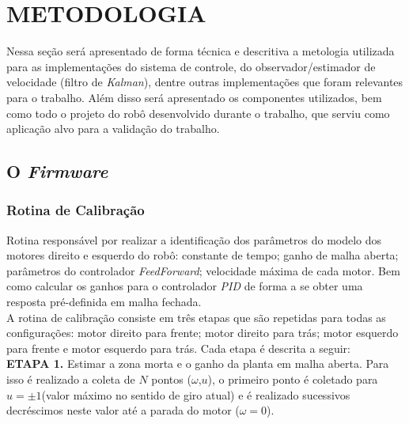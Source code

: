 \section{METODOLOGIA}
Nessa seção será apresentado de forma técnica e descritiva a metologia utilizada para as implementações do sistema de controle, do observador/estimador de velocidade (filtro de \emph{Kalman}), dentre outras implementações que foram relevantes para o trabalho. Além disso será apresentado os componentes utilizados, bem como todo o projeto do robô desenvolvido durante o trabalho, que serviu como aplicação alvo para a validação do trabalho.



\subsection{O \emph{Firmware}}

\subsubsection{Rotina de Calibração}

Rotina responsável por realizar a identificação dos parâmetros do modelo dos motores direito e esquerdo do robô: constante de tempo; ganho de malha aberta; parâmetros do controlador \emph{FeedForward}; velocidade máxima de cada motor. Bem como calcular os ganhos para o controlador \emph{PID} de forma a se obter uma resposta pré-definida em malha fechada.\\

A rotina de calibração consiste em três etapas que são repetidas para todas as configurações: motor direito para frente; motor direito para trás; motor esquerdo para frente e motor esquerdo para trás. Cada etapa é descrita a seguir: \\


\textbf{ETAPA 1.} Estimar a zona morta e o ganho da planta em malha aberta. Para isso é realizado a coleta de $N$ pontos ($\omega$,$u$), o primeiro ponto é coletado para $u = \pm1$(valor máximo no sentido de giro atual) e é realizado sucessivos decréscimos neste valor até a parada do motor ($\omega = 0$). \\

